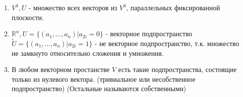 \documentclass[a4paper, 12pt]{article}
\newcommand{\R}{\mathbb R}
\theoremstyle{definition}
\begin{document}
    \begin{enumerate} 
      \item $V^3, U$ - множество всех векторов из $V^3$, параллельных фиксированной\\ плоскости.
      \item $\R^n, U=\{(a_1,..., a_n) | a_{2i} = 0\}$ - векторное подпространство \\ $\widetilde{U} = \{(a_1,..., a_n) | a_{2i} = 1\}$ - не векторное подпространство, т.к. множество не замкнуто относительно сложения и умножения.
      \item В любом векторном простанстве $V$ есть такие подпространства, состоящие только из нулевого вектора. (тривиальное или несобственное подпространство) (Остальные называются собственными)
    \end{enumerate}
  
  \newpage
\end{document}
